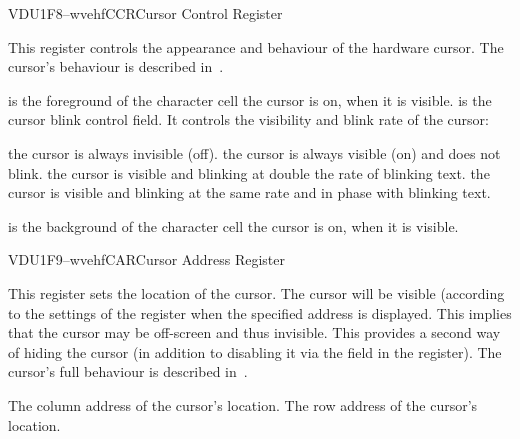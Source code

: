 \begin{ioport}{VDU}{1F8}{--wvehf}{CCR}{Cursor Control Register}

  This register controls the appearance and behaviour of the hardware
  cursor. The cursor's behaviour is described in~.

  \begin{bitfield}
  \end{bitfield}

  \begin{description}
     is the foreground  of the character
    cell the cursor is on, when it is visible.
     is the cursor blink control field. It controls the
    visibility and blink rate of the cursor:
    
    \begin{description}
       the cursor is always invisible (off).
       the cursor is always visible (on) and does not blink.
       the cursor is visible and blinking at double the rate of
      blinking text.
       the cursor is visible and blinking at the same rate and
      in phase with blinking text.
    \end{description}
    
     is the background  of the character
    cell the cursor is on, when it is visible.
  \end{description}

\end{ioport}

\begin{ioport}{VDU}{1F9}{--wvehf}{CAR}{Cursor Address Register}

  This register sets the location of the cursor. The cursor will be visible
  (according to the settings of the  register when the specified
  address is displayed. This implies that the cursor may be off-screen and thus
  invisible. This provides a second way of hiding the cursor (in addition to
  disabling it via the  field in the  register). The
  cursor's full behaviour is described in~.

  \begin{bitfield}
     The column address of the cursor's location.
     The row address of the cursor's location.
  \end{bitfield}

\end{ioport}


